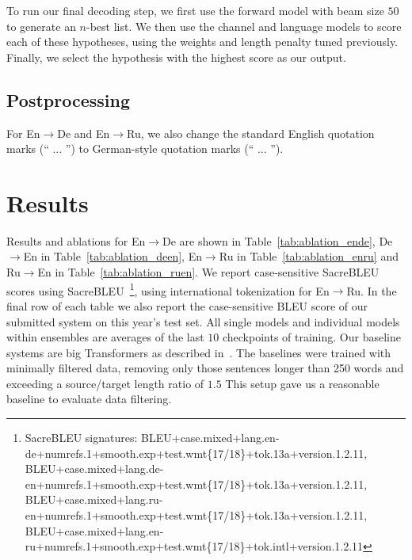 \documentclass[11pt,a4paper]{article}
\newcommand{\entode}{En$\rightarrow$De}
\newcommand{\detoen}{De$\rightarrow$En}
\newcommand{\entoru}{En$\rightarrow$Ru}
\newcommand{\rutoen}{Ru$\rightarrow$En}
\begin{document}
To run our final decoding step, we first use the forward model with beam size $50$ to generate an $n$-best list.
We then use the channel and language models to score each of these hypotheses, using the weights and length penalty tuned previously.
Finally, we select the hypothesis with the highest score as our output.

\subsection{Postprocessing}
For \entode{} and \entoru{}, we also change the standard English quotation marks (`` ... '') to German-style quotation marks (\enquote{ ... }).
 
\section{Results}
Results and ablations for \entode{} are shown in Table~\ref{tab:ablation_ende}, \detoen{} in Table~\ref{tab:ablation_deen}, \entoru{} in Table~\ref{tab:ablation_enru} and \rutoen{} in Table~\ref{tab:ablation_ruen}.
We report case-sensitive SacreBLEU scores using SacreBLEU~\cite{matt2018clarity}\footnote{SacreBLEU signatures:\newline{} BLEU+case.mixed+lang.en-de+numrefs.1+smooth.exp+\newline{}test.wmt\{17/18\}+tok.13a+version.1.2.11, BLEU+case.mixed+lang.de-en+numrefs.1+smooth.exp+\newline{}test.wmt\{17/18\}+tok.13a+version.1.2.11, BLEU+case.mixed+lang.ru-en+numrefs.1+smooth.exp+\newline{}test.wmt\{17/18\}+tok.13a+version.1.2.11, BLEU+case.mixed+lang.en-ru+numrefs.1+smooth.exp+\newline{}test.wmt\{17/18\}+tok.intl+version.1.2.11}, using international tokenization for \entoru{}.
In the final row of each table we also report the case-sensitive BLEU score of our submitted system on this year's test set.
All single models and individual models within ensembles are averages of the last $10$ checkpoints of training.
Our baseline systems are big Transformers as described in~\cite{vaswani2017attention}.
The baselines were trained with minimally filtered data, removing only those sentences longer than 250 words and exceeding a source/target length ratio of $1.5$
This setup gave us a reasonable baseline to evaluate data filtering.
\end{document}

